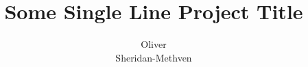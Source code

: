 \documentclass[a4paper, 10pt, english, oneside]{extarticle}
\author{Oliver\\Sheridan-Methven} %
\title{Some Single Line Project Title} %
\begin{document}
\maketitle %

\blindmathpaper %
\end{document}
